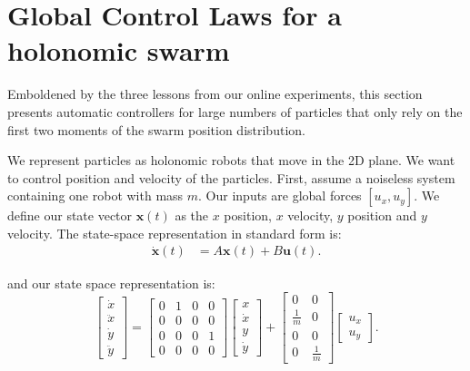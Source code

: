 \section{Global Control Laws for a holonomic swarm}
\label{sec:theory}



Emboldened by the three lessons from our online experiments, this section presents automatic controllers for large numbers of particles that only rely on the first two moments of the swarm position distribution.

We represent particles as holonomic robots that move in the 2D plane. We want to control position and velocity of the particles. 
First, assume a noiseless system containing one robot with mass $m$.
 Our inputs are global forces $[u_x,u_y]$. We define our state vector $\mathbf{x}(t)$ as the $x$ position, $x$ velocity, $y$ position and $y$ velocity.
The state-space representation in standard form is: 
\begin{align}\label{eq:stdform}
\dot{\mathbf{x}}(t)  &=  A \mathbf{x}(t) + B \mathbf{u}(t).
\end{align}

and our state space representation is:
\begin{equation}
\begin{bmatrix}
\dot{x}\\ 
\ddot{x}\\
\dot{y}\\
\ddot{y}
\end{bmatrix} = \begin{bmatrix}
0 & 1 & 0 & 0 \\
0 & 0 & 0 & 0\\
0 & 0 & 0 & 1\\
0 & 0 & 0 & 0
\end{bmatrix}  \begin{bmatrix}
x\\
\dot{x}\\
y\\
\dot{y}
\end{bmatrix} + \begin{bmatrix}
0 & 0 \\
\frac{1}{m} & 0 \\
0 & 0 \\
0 & \frac{1}{m}
\end{bmatrix} 
 \begin{bmatrix}
 u_x\\
 u_y\end{bmatrix}.
\end{equation}

